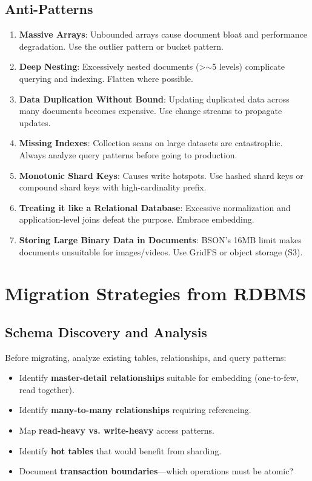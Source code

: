 \documentclass[12pt,a4paper]{article}
\begin{document}
\subsection{Anti-Patterns}

\begin{antipattern}
\begin{enumerate}[noitemsep]
    \item \textbf{Massive Arrays}: Unbounded arrays cause document bloat and performance degradation. Use the outlier pattern or bucket pattern.
    \item \textbf{Deep Nesting}: Excessively nested documents (>$\sim$5 levels) complicate querying and indexing. Flatten where possible.
    \item \textbf{Data Duplication Without Bound}: Updating duplicated data across many documents becomes expensive. Use change streams to propagate updates.
    \item \textbf{Missing Indexes}: Collection scans on large datasets are catastrophic. Always analyze query patterns before going to production.
    \item \textbf{Monotonic Shard Keys}: Causes write hotspots. Use hashed shard keys or compound shard keys with high-cardinality prefix.
    \item \textbf{Treating it like a Relational Database}: Excessive normalization and application-level joins defeat the purpose. Embrace embedding.
    \item \textbf{Storing Large Binary Data in Documents}: BSON's 16MB limit makes documents unsuitable for images/videos. Use GridFS or object storage (S3).
\end{enumerate}
\end{antipattern}

\section{Migration Strategies from RDBMS}

\subsection{Schema Discovery and Analysis}

Before migrating, analyze existing tables, relationships, and query patterns:
\begin{itemize}[noitemsep]
    \item Identify \textbf{master-detail relationships} suitable for embedding (one-to-few, read together).
    \item Identify \textbf{many-to-many relationships} requiring referencing.
    \item Map \textbf{read-heavy vs. write-heavy} access patterns.
    \item Identify \textbf{hot tables} that would benefit from sharding.
    \item Document \textbf{transaction boundaries}---which operations must be atomic?
\end{itemize}
\end{document}

